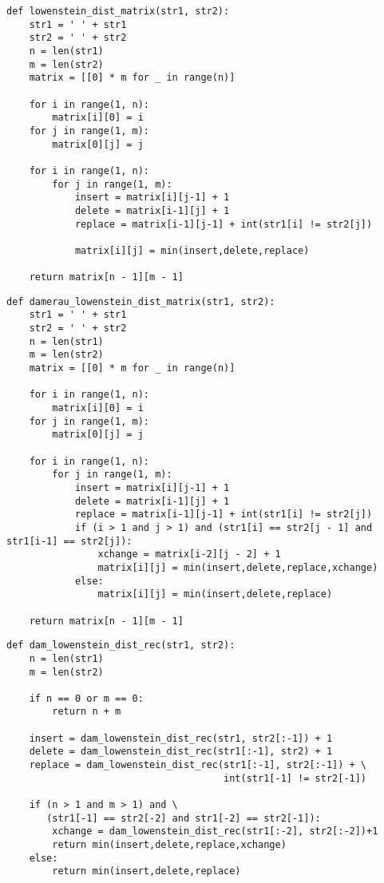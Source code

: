\begin{lstlisting}[label=lst:l-matr,caption=Функция нерекурсивного поиска расстояния Левенштейна]
def lowenstein_dist_matrix(str1, str2):
    str1 = ' ' + str1
    str2 = ' ' + str2
    n = len(str1)
    m = len(str2)
    matrix = [[0] * m for _ in range(n)]

    for i in range(1, n):
        matrix[i][0] = i  
    for j in range(1, m):
        matrix[0][j] = j

    for i in range(1, n):
        for j in range(1, m):
            insert = matrix[i][j-1] + 1
            delete = matrix[i-1][j] + 1
            replace = matrix[i-1][j-1] + int(str1[i] != str2[j])

            matrix[i][j] = min(insert,delete,replace)

    return matrix[n - 1][m - 1]
\end{lstlisting}
\clearpage

\begin{lstlisting}[label=lst:dl-matr,caption=Функция нерекурсивного поиска расстояния Дамерау- Левенштейна]
def damerau_lowenstein_dist_matrix(str1, str2):
    str1 = ' ' + str1
    str2 = ' ' + str2
    n = len(str1)
    m = len(str2)
    matrix = [[0] * m for _ in range(n)]

    for i in range(1, n):
        matrix[i][0] = i
    for j in range(1, m):
        matrix[0][j] = j 

    for i in range(1, n):
        for j in range(1, m):
            insert = matrix[i][j-1] + 1
            delete = matrix[i-1][j] + 1
            replace = matrix[i-1][j-1] + int(str1[i] != str2[j])
            if (i > 1 and j > 1) and (str1[i] == str2[j - 1] and str1[i-1] == str2[j]):
                xchange = matrix[i-2][j - 2] + 1
                matrix[i][j] = min(insert,delete,replace,xchange)
            else:
                matrix[i][j] = min(insert,delete,replace)

    return matrix[n - 1][m - 1]
\end{lstlisting}
\clearpage

\begin{lstlisting}[label=lst:dl-rec,caption=Функция рекурсивного алгоритма поиска расстояния Дамерау-Левенштейна без кеширования]
def dam_lowenstein_dist_rec(str1, str2):
    n = len(str1)
    m = len(str2)

    if n == 0 or m == 0:
        return n + m

    insert = dam_lowenstein_dist_rec(str1, str2[:-1]) + 1
    delete = dam_lowenstein_dist_rec(str1[:-1], str2) + 1
    replace = dam_lowenstein_dist_rec(str1[:-1], str2[:-1]) + \ 
                                      int(str1[-1] != str2[-1])

    if (n > 1 and m > 1) and \
       (str1[-1] == str2[-2] and str1[-2] == str2[-1]):
        xchange = dam_lowenstein_dist_rec(str1[:-2], str2[:-2])+1
        return min(insert,delete,replace,xchange)
    else:
        return min(insert,delete,replace)
\end{lstlisting}
\clearpage

